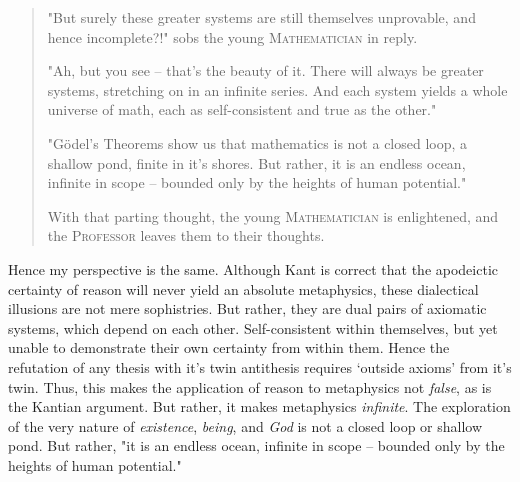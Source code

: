 \begin{quote}
  "But surely these greater systems are still themselves unprovable, and hence incomplete?!" sobs the young \textsc{Mathematician} in reply.

  "Ah, but you see -- that's the beauty of it. There will always be greater systems, stretching on in an infinite series. And each system yields a whole universe of math, each as self-consistent and true as the other."

  "Gödel's Theorems show us that mathematics is not a closed loop, a shallow pond, finite in it's shores. But rather, it is an endless ocean, infinite in scope -- bounded only by the heights of human potential."

  With that parting thought, the young \textsc{Mathematician} is enlightened, and the \textsc{Professor} leaves them to their thoughts.
\end{quote}

\noindent
Hence my perspective is the same. Although Kant is correct that the apodeictic certainty of reason will never yield an absolute metaphysics, these dialectical illusions are not mere sophistries. But rather, they are dual pairs of axiomatic systems, which depend on each other. Self-consistent within themselves, but yet unable to demonstrate their own certainty from within them. Hence the refutation of any thesis with it's twin antithesis requires `outside axioms' from it's twin. Thus, this makes the application of reason to metaphysics not \emph{false}, as is the Kantian argument. But rather, it makes metaphysics \emph{infinite}. The exploration of the very nature of \emph{existence}, \emph{being}, and \emph{God} is not a closed loop or shallow pond. But rather, "it is an endless ocean, infinite in scope -- bounded only by the heights of human potential."


